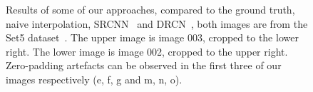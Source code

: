 \documentclass[11pt]{article}
\begin{document}
\begin{figure}[t!]
	\qquad
{}
	\qquad
{}
	\qquad
{}


	
\caption{Results of some of our approaches, compared to the ground truth, naive interpolation, SRCNN~\cite{dong2016image} and DRCN~\cite{kim2016deeply}, both images are from the Set5 dataset~\cite{set5}. The upper image is image 003, cropped to the lower right. The lower image is image 002, cropped to the upper right. Zero-padding artefacts can be observed in the first three of our images respectively (e, f, g and m, n, o).}
\end{figure}
\end{document}
